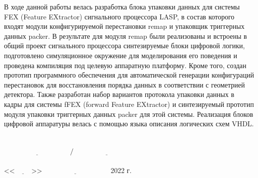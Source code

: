 \documentclass[a4paper, 12pt]{extarticle}
\begin{document}
В ходе данной работы велась разработка блока упаковки данных для системы FEX (Feature EXtractor) сигнального процессора LASP, в состав которого входят модули конфигурируемой перестановки remap и упаковщик триггерных данных packer. В результате для модуля remap были реализованы и встроены в общий проект сигнального процессора синтезируемые блоки цифровой логики, подготовлено симуляционное окружение для моделирования его поведения и проведена компиляция под целевую аппаратную платформу. Кроме того, создан прототип программного обеспечения для автоматической генерации конфигураций перестановок для восстановления порядка данных в соответствии с геометрией детектора. Также разработан набор вариантов протокола упаковки данных в кадры для системы fFEX (forward Feature EXtractor) и синтезируемый прототип модуля упаковки триггерных данных packer для этой системы. Реализация блоков цифровой аппаратуры велась с помощью языка описания логических схем VHDL.
\\~\\~\\
{\setlength{\parindent}{0cm}
$\underline{\hspace{4cm}}\text{/}\underline{\hspace{4cm}}$\\~\\
<<$\underline{\hspace{1cm}}$>>$\underline{\hspace{4cm}}$ 2022 г.\\
}
\end{document}
